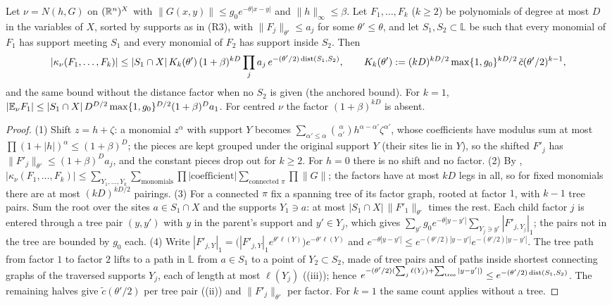 \begin{lemma}\label{rot:lem:R1conn}
Let $\nu=N(h,G)$ on $(\mathbb R^n)^X$ with $\|G(x,y)\|\le g_0e^{-\theta|x-y|}$ and $\|h\|_\infty\le\beta$. Let $F_1,\dots,F_k$ ($k\ge2$) be polynomials of degree at most $D$ in the variables of $X$, sorted by supports as in (R3), with $\|F_j\|_{\theta'}\le a_j$ for some $\theta'\le\theta$, and let $S_1,S_2\subset\mathbb{L}$ be such that every monomial of $F_1$ has support meeting $S_1$ and every monomial of $F_2$ has support inside $S_2$. Then
\[
|\kappa_\nu(F_1,\dots,F_k)|\le|S_1\cap X|\,K_k(\theta')\,(1+\beta)^{kD}\prod_ja_j\,e^{-(\theta'/2)\operatorname{dist}(S_1,S_2)},\qquad K_k(\theta'):=(kD)^{kD/2}\max\{1,g_0\}^{kD/2}\,\tilde c(\theta'/2)^{k-1},
\]
and the same bound without the distance factor when no $S_2$ is given (the anchored bound). For $k=1$, $|\mathbb E_\nu F_1|\le|S_1\cap X|\,D^{D/2}\max\{1,g_0\}^{D/2}(1+\beta)^Da_1$. For centred $\nu$ the factor $(1+\beta)^{kD}$ is absent.
\end{lemma}
\begin{proof}
(1) Shift $z=h+\zeta$: a monomial $z^\alpha$ with support $Y$ becomes $\sum_{\alpha'\le\alpha}\binom{\alpha}{\alpha'}h^{\alpha-\alpha'}\zeta^{\alpha'}$, whose coefficients have modulus sum at most $\prod(1+|h|)^{\alpha}\le(1+\beta)^D$; the pieces are kept grouped under the original support $Y$ (their sites lie in $Y$), so the shifted $F'_j$ has $\|F'_j\|_{\theta'}\le(1+\beta)^Da_j$, and the constant pieces drop out for $k\ge2$. For $h=0$ there is no shift and no factor. (2) By , $|\kappa_\nu(F_1,\dots,F_k)|\le\sum_{Y_1,\dots,Y_k}\sum_{\text{monomials}}\prod|\text{coefficient}|\sum_{\text{connected }\pi}\prod\|G\|$; the factors have at most $kD$ legs in all, so for fixed monomials there are at most $(kD)^{kD/2}$ pairings. (3) For a connected $\pi$ fix a spanning tree of its factor graph, rooted at factor $1$, with $k-1$ tree pairs. Sum the root over the sites $a\in S_1\cap X$ and the supports $Y_1\ni a$: at most $|S_1\cap X|\,\|F'_1\|_{\theta'}$ times the rest. Each child factor $j$ is entered through a tree pair $(y,y')$ with $y$ in the parent's support and $y'\in Y_j$, which gives $\sum_{y'}g_0e^{-\theta|y-y'|}\sum_{Y_j\ni y'}|F'_{j,Y_j}|_1$; the pairs not in the tree are bounded by $g_0$ each. (4) Write $|F'_{j,Y}|_1=\big(|F'_{j,Y}|_1e^{\theta'\ell(Y)}\big)e^{-\theta'\ell(Y)}$ and $e^{-\theta|y-y'|}\le e^{-(\theta'/2)|y-y'|}e^{-(\theta'/2)|y-y'|}$. The tree path from factor $1$ to factor $2$ lifts to a path in $\mathbb{L}$ from $a\in S_1$ to a point of $Y_2\subset S_2$, made of tree pairs and of paths inside shortest connecting graphs of the traversed supports $Y_j$, each of length at most $\ell(Y_j)$ ((iii)); hence $e^{-(\theta'/2)(\sum_j\ell(Y_j)+\sum_{\text{tree}}|y-y'|)}\le e^{-(\theta'/2)\operatorname{dist}(S_1,S_2)}$. The remaining halves give $\tilde c(\theta'/2)$ per tree pair ((ii)) and $\|F'_j\|_{\theta'}$ per factor. For $k=1$ the same count applies without a tree.
\end{proof}

